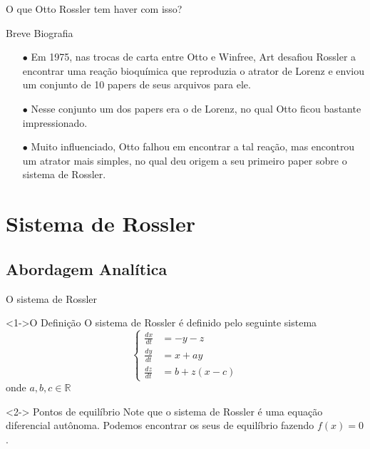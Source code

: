 \documentclass{beamer}
\begin{document}
\begin{frame}{O que Otto Rossler tem haver com isso?}
	
	\begin{exampleblock}{Breve Biografia}
		\begin{itemize}
			\item [$\bullet$] Em 1975, nas trocas de carta entre Otto e Winfree, Art desafiou Rossler a encontrar uma reação bioquímica que reproduzia o atrator de Lorenz e enviou um conjunto de 10 papers de seus arquivos para ele.
			
			\item [$\bullet$] Nesse conjunto um dos papers era o de Lorenz, no qual Otto ficou bastante impressionado.
			
			\item [$\bullet$] Muito influenciado, Otto falhou em encontrar a tal reação, mas encontrou um atrator mais simples, no qual deu origem a seu primeiro paper sobre o sistema de Rossler.
		\end{itemize}
	\end{exampleblock}
\end{frame}

\section{Sistema de Rossler}
\subsection{Abordagem Analítica}
\begin{frame}{O sistema de Rossler}
	\begin{exampleblock}
		<1->{O Definição}
		O sistema de Rossler é definido pelo seguinte sistema
		\begin{equation}
			\begin{cases}
				\frac{dx}{dt} &= -y - z \\
				\frac{dy}{dt} &= x + ay \\
				\frac{dz}{dt} &= b + z(x - c)
			\end{cases}
		\end{equation}
		onde $a, b, c \in \mathbb{R}$
	\end{exampleblock}

	\begin{exampleblock}
		<2-> {Pontos de equilíbrio} 
		Note que o sistema de Rossler é uma equação diferencial autônoma. Podemos
		encontrar os seus de equilíbrio fazendo $f(x) = 0$.
	\end{exampleblock}
\end{frame}
\end{document}
